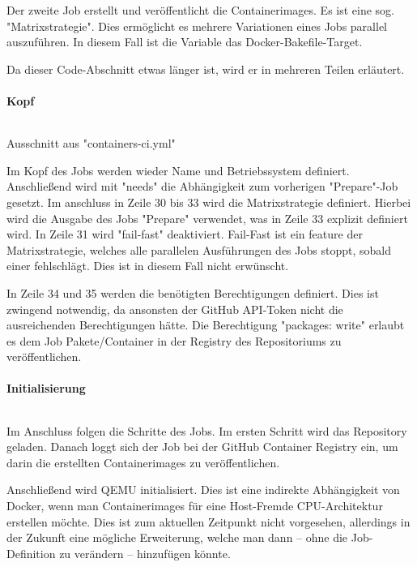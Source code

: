 Der zweite Job erstellt und veröffentlicht die Containerimages. Es ist eine sog. "Matrixstrategie". Dies ermöglicht es mehrere Variationen eines Jobs parallel auszuführen. In diesem Fall ist die Variable das Docker-Bakefile-Target. 

Da dieser Code-Abschnitt etwas länger ist, wird er in mehreren Teilen erläutert.

\paragraph{Kopf}

\begin{listing}
    \inputminted[firstline=25,lastline=35]{yaml}{./code-examples/containers-ci.yml}
    \caption{Ausschnitt aus "containers-ci.yml"}
    \label{lst:containers-ci-25-35}
\end{listing}

Im Kopf des Jobs werden wieder Name und Betriebssystem definiert. Anschließend wird mit "needs" die Abhängigkeit zum vorherigen "Prepare"-Job gesetzt. Im anschluss in Zeile 30 bis 33 wird die Matrixstrategie definiert. Hierbei wird die Ausgabe des Jobs "Prepare" verwendet, was in Zeile 33 explizit definiert wird. In Zeile 31 wird "fail-fast" deaktiviert. Fail-Fast ist ein feature der Matrixstrategie, welches alle parallelen Ausführungen des Jobs stoppt, sobald einer fehlschlägt. Dies ist in diesem Fall nicht erwünscht.

In Zeile 34 und 35 werden die benötigten Berechtigungen definiert. Dies ist zwingend notwendig, da ansonsten der GitHub API-Token nicht die ausreichenden Berechtigungen hätte. Die Berechtigung "packages: write" erlaubt es dem Job Pakete/Container in der Registry des Repositoriums zu veröffentlichen.

\paragraph{Initialisierung}

\inputminted[firstline=36,lastline=49]{yaml}{./code-examples/containers-ci.yml}

Im Anschluss folgen die Schritte des Jobs. Im ersten Schritt wird das Repository geladen. Danach loggt sich der Job bei der GitHub Container Registry ein, um darin die erstellten Containerimages zu veröffentlichen. 

Anschließend wird QEMU initialisiert. Dies ist eine indirekte Abhängigkeit von Docker, wenn man Containerimages für eine Host-Fremde CPU-Architektur erstellen möchte. Dies ist zum aktuellen Zeitpunkt nicht vorgesehen, allerdings in der Zukunft eine mögliche Erweiterung, welche man dann – ohne die Job-Definition zu verändern – hinzufügen könnte.

